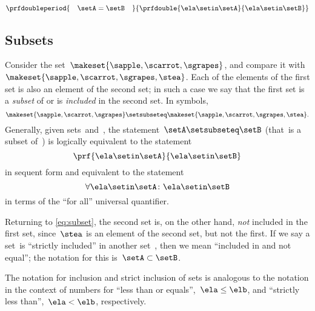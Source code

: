 \begin{equation}
    \prfdoubleperiod{
        \quad \setA = \setB \quad
    }{
        \prfdouble{
            \ela \setin\setA
        }{
            \ela \setin\setB
        }
    }
\end{equation}


\subsection{Subsets}
\label{sec:set-inclusion}
Consider the set~$\makeset{ \sapple, \scarrot, \sgrapes }$, and compare it with~$\makeset{ \sapple, \scarrot, \sgrapes, \stea }$.
Each of the elements of the first set is also an element of the second set;
in such a case we say that the first set is a \emph{subset} of or is \emph{included} in the second set.
In symbols,
%
\begin{equation}
    \label{eq:subset}
    \makeset{ \sapple, \scarrot, \sgrapes } \setsubseteq \makeset{ \sapple, \scarrot, \sgrapes, \stea }.
\end{equation}
%
Generally, given sets~\setA and~\setB, the statement~$\setA \setsubseteq \setB$ (that~\setA is a subset of~\setB) is logically equivalent to the statement
%
\begin{equation}
    \prf{
        \ela \setin\setA
    }{
        \ela \setin\setB
    }
\end{equation}
in sequent form and equivalent to the statement
\begin{equation}
    \label{eq:inclusion-via-quantifier}
    \forall \ela \setin\setA \colon \ela \setin\setB
\end{equation}
in terms of the ``for all'' universal quantifier.

Returning to \cref{eq:subset}, the second set is, on the other hand, \emph{not} included in the first set, since~$\stea$ is an element of the second set, but not the first.
If we say a set~\setA is ``strictly included'' in another set~\setB, then we mean ``included in and not equal''; the notation for this is~$\setA \subset \setB$.

The notation for inclusion and strict inclusion of sets is analogous to the notation in the context of numbers for ``less than or equals'',~$\ela \leq \elb$,  and ``strictly less than'',~$\ela < \elb$, respectively.


